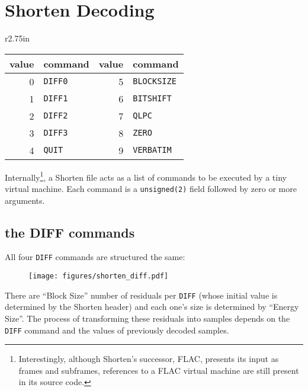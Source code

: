 \section{Shorten Decoding}
\begin{wrapfigure}[4]{r}{2.75in}
\begin{tabular}{|r|l||r|l|}
\hline
value & command & value & command \\
\hline
0 & \texttt{DIFF0} & 5 & \texttt{BLOCKSIZE} \\
1 & \texttt{DIFF1} & 6 & \texttt{BITSHIFT} \\
2 & \texttt{DIFF2} & 7 & \texttt{QLPC} \\
3 & \texttt{DIFF3} & 8 & \texttt{ZERO} \\
4 & \texttt{QUIT} & 9 & \texttt{VERBATIM} \\
\hline
\end{tabular}
\end{wrapfigure}
Internally\footnote{Interestingly, although
Shorten's successor, FLAC, presents its input as frames and subframes,
references to a FLAC virtual machine are still present in its source code.},
a Shorten file acts as a list of commands to be executed by a tiny
virtual machine.
Each command is a \texttt{unsigned(2)} field followed by zero or more
arguments.

\subsection{the DIFF commands}
All four \texttt{DIFF} commands are structured the same:
\begin{figure}[h]
\texttt{[image: figures/shorten\_diff.pdf]}
\end{figure}
\par
\noindent
There are ``Block Size'' number of residuals per \texttt{DIFF}
(whose initial value is determined by the Shorten header)
and each one's size is determined by ``Energy Size''.
The process of transforming these residuals into samples
depends on the \texttt{DIFF} command and the values of
previously decoded samples.

